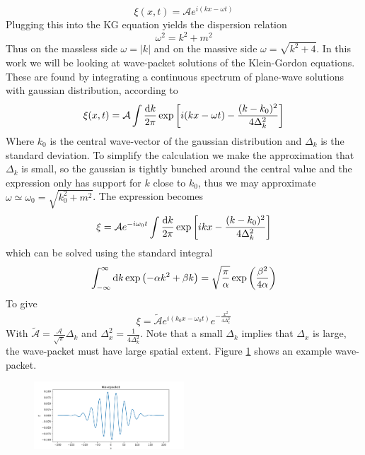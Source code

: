 \documentclass[11pt, oneside]{article}  	%
\numberwithin{equation}{section}
\newcommand{\drv}{\ensuremath{\textup{d}}}
\begin{document}
\begin{equation}
\xi(x,t) = \mathcal{A}e^{i(kx-\omega t)}
\end{equation}
Plugging this into the KG equation yields the dispersion relation
\begin{equation}
\omega^2 = k^2 + m^2
\end{equation}
Thus on the massless side $\omega = |k|$ and on the massive side $\omega = \sqrt{k^2 + 4}$. In this work we will be looking at wave-packet solutions of the Klein-Gordon equations. These are found by integrating a continuous spectrum of plane-wave solutions with gaussian distribution, according to 
\begin{equation}
\xi (x,t) =\mathcal{A} \int \frac{\drv k}{2\pi} \exp\left[{i(kx-\omega t)} - \frac{(k-k_0)^2}{4\Delta_k^2} \right]
\end{equation}
Where $k_0$ is the central wave-vector of the gaussian distribution and $\Delta_k$ is the standard deviation. To simplify the calculation we make the approximation that $\Delta_k$ is small, so the gaussian is tightly bunched around the central value and the expression only has support for $k$ close to $k_0$, thus we may approximate $\omega \simeq \omega_0 = \sqrt{k_0^2 +m^2}$. The expression becomes
\begin{equation} \label{wave_eqn}
\xi =\mathcal{A}e^{-i\omega_0 t} \int \frac{\drv k}{2\pi} \exp\left[{ikx} - \frac{(k-k_0)^2}{4\Delta_k^2} \right]
\end{equation}
which can be solved using the standard integral
\begin{equation}
\int_{-\infty}^{\infty} \drv k\exp \left ( -\alpha k^2 + \beta k \right ) = \sqrt{\frac{\pi}{\alpha}}\exp\left( \frac{\beta^2}{4\alpha}\right ) 
\end{equation}
To give
\begin{equation}
\xi =\tilde{\mathcal{A}}e^{i(k_0 x-\omega_0 t)} e^{-\frac{x^2}{4\Delta_x^2}}
\end{equation}
With $\tilde{\mathcal{A}} = \frac{\mathcal{A}}{\sqrt{\pi}}\Delta_k $ and $\Delta_x^2 = \frac{1}{4\Delta_k^2}$. Note that a small $\Delta_k$ implies that $\Delta_x$ is large, the wave-packet must have large spatial extent. Figure \ref{wavepacket} shows an example wave-packet.
\begin{figure}
\centering
\includegraphics[width=0.5\textwidth]{wavepacket.png}
 \label{wavepacket}
\end{figure}
\end{document}
